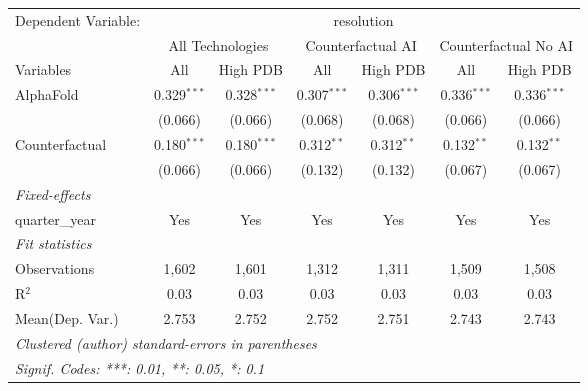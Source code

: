 \begingroup
\centering
\begin{tabular}{lcccccc}
   \tabularnewline \midrule \midrule
   Dependent Variable: & \multicolumn{6}{c}{resolution}\\
 & \multicolumn{2}{c}{All Technologies} & \multicolumn{2}{c}{Counterfactual AI} & \multicolumn{2}{c}{Counterfactual No AI} \\
\cmidrule(lr){1-1}\cmidrule(lr){2-3} \cmidrule(lr){4-5} \cmidrule(lr){6-7}
Variables & \multicolumn{1}{c}{All} & \multicolumn{1}{c}{High PDB} & \multicolumn{1}{c}{All} & \multicolumn{1}{c}{High PDB} & \multicolumn{1}{c}{All} & \multicolumn{1}{c}{High PDB} \\
\cmidrule(lr){1-1}\cmidrule(lr){2-2} \cmidrule(lr){3-3} \cmidrule(lr){4-4} \cmidrule(lr){5-5} \cmidrule(lr){6-6} \cmidrule(lr){7-7}
   AlphaFold      & 0.329$^{***}$ & 0.328$^{***}$ & 0.307$^{***}$ & 0.306$^{***}$ & 0.336$^{***}$ & 0.336$^{***}$\\   
                  & (0.066)       & (0.066)       & (0.068)       & (0.068)       & (0.066)       & (0.066)\\   
   Counterfactual & 0.180$^{***}$ & 0.180$^{***}$ & 0.312$^{**}$  & 0.312$^{**}$  & 0.132$^{**}$  & 0.132$^{**}$\\   
                  & (0.066)       & (0.066)       & (0.132)       & (0.132)       & (0.067)       & (0.067)\\   
   \midrule
   \emph{Fixed-effects}\\
   quarter\_year  & Yes           & Yes           & Yes           & Yes           & Yes           & Yes\\  
   \midrule
   \emph{Fit statistics}\\
   Observations   & 1,602         & 1,601         & 1,312         & 1,311         & 1,509         & 1,508\\  
   R$^2$          & 0.03          & 0.03          & 0.03          & 0.03          & 0.03          & 0.03\\  
Mean(Dep. Var.) & 2.753 & 2.752 & 2.752 & 2.751 & 2.743 & 2.743 \\
   \midrule \midrule
   \multicolumn{7}{l}{\emph{Clustered (author) standard-errors in parentheses}}\\
   \multicolumn{7}{l}{\emph{Signif. Codes: ***: 0.01, **: 0.05, *: 0.1}}\\
\end{tabular}
\par\endgroup
